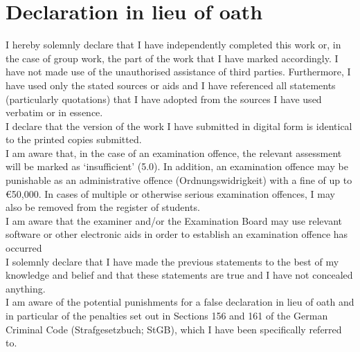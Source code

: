 \thispagestyle{empty}

\section*{Declaration in lieu of oath}
I hereby solemnly declare that I have independently completed this work or, in the case of
group work, the part of the work that I have marked accordingly. I have not made use of the
unauthorised assistance of third parties. Furthermore, I have used only the stated sources or
aids and I have referenced all statements (particularly quotations) that I have adopted from the
sources I have used verbatim or in essence.\\

I declare that the version of the work I have submitted in digital form is identical to the printed
copies submitted.\\

I am aware that, in the case of an examination offence, the relevant assessment will be marked
as ‘insufficient’ (5.0). In addition, an examination offence may be punishable as an administrative offence (Ordnungswidrigkeit) with a fine of up to €50,000. In cases of multiple or otherwise
serious examination offences, I may also be removed from the register of students.\\

I am aware that the examiner and/or the Examination Board may use relevant software or
other electronic aids in order to establish an examination offence has occurred
\\

I solemnly declare that I have made the previous statements to the best of my knowledge and
belief and that these statements are true and I have not concealed anything.\\

I am aware of the potential punishments for a false declaration in lieu of oath and in particular
of the penalties set out in Sections 156 and 161 of the German Criminal Code (Strafgesetzbuch; StGB), which I have been specifically referred to.


